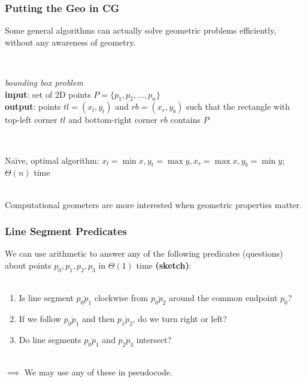 \documentclass{beamer}
\newcommand{\stanza}{ \\~\ }
\begin{document}
\begin{frame} \frametitle{Putting the Geo in CG}
Some general algorithms can actually solve geometric problems efficiently, without
any awareness of geometry. \stanza

\begin{columns}
  \begin{column}{0.7 \textwidth}
  \emph{bounding box problem} \\
  \textbf{input}: set of 2D points $P=\{p_1, p_2, \ldots, p_n\}$ \\
  \textbf{output}: points $tl=(x_l, y_t)$ and $rb=(x_r, y_b)$ such that the rectangle
  with top-left corner $tl$ and bottom-right corner $rb$ contains $P$ \stanza
  \end{column}
  \begin{column}{0.3 \textwidth}
    \begin{center}
    \end{center}
  \end{column}
\end{columns}

Na\"{i}ve, optimal algorithm:
$x_l = \min x, y_t = \max y, x_r = \max x, y_b = \min y$;
$\Theta(n)$ time \stanza

Computational geometers are more interested when geometric properties matter.
\end{frame}

\begin{frame} \frametitle{Line Segment Predicates}
We can use arithmetic to answer any of the following predicates (questions)
about points $p_0, p_1, p_2, p_3$ in $\Theta(1)$ time \textbf{(sketch)}: \stanza
\begin{enumerate}
  \item Is line segment $\overline{p_0 p_1}$ clockwise from $\overline{p_0 p_2}$
    around the common endpoint $p_0$?
  \item If we follow $\overline{p_0 p_1}$ and then $\overline{p_1 p_2}$, do we
    turn right or left?
  \item Do line segments $\overline{p_0 p_1}$ and $\overline{p_2 p_3}$
    intersect? \stanza
\end{enumerate}

$\implies$ We may use any of these in pseudocode.
\end{frame}
\end{document}
